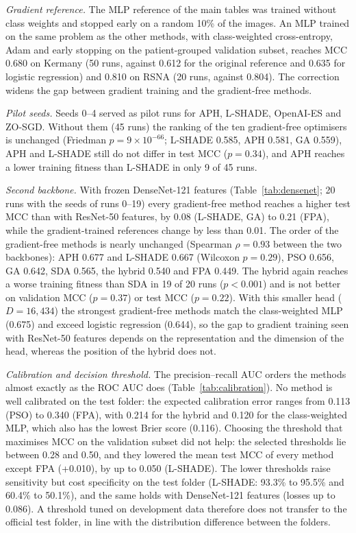 \documentclass[10pt,letterpaper]{article}
\begin{document}
\emph{Gradient reference.} The MLP reference of the main tables was trained without class weights and stopped early on a random 10\% of the images. An MLP trained on the same problem as the other methods, with class-weighted cross-entropy, Adam and early stopping on the patient-grouped validation subset, reaches MCC 0.680 on Kermany (50 runs, against 0.612 for the original reference and 0.635 for logistic regression) and 0.810 on RSNA (20 runs, against 0.804). The correction widens the gap between gradient training and the gradient-free methods.

\emph{Pilot seeds.} Seeds 0--4 served as pilot runs for APH, L-SHADE, OpenAI-ES and ZO-SGD. Without them (45 runs) the ranking of the ten gradient-free optimisers is unchanged (Friedman $p=9\times10^{-66}$; L-SHADE 0.585, APH 0.581, GA 0.559), APH and L-SHADE still do not differ in test MCC ($p=0.34$), and APH reaches a lower training fitness than L-SHADE in only 9 of 45 runs.

\emph{Second backbone.} With frozen DenseNet-121 features (Table~\ref{tab:densenet}; 20 runs with the seeds of runs 0--19) every gradient-free method reaches a higher test MCC than with ResNet-50 features, by 0.08 (L-SHADE, GA) to 0.21 (FPA), while the gradient-trained references change by less than 0.01. The order of the gradient-free methods is nearly unchanged (Spearman $\rho=0.93$ between the two backbones): APH 0.677 and L-SHADE 0.667 (Wilcoxon $p=0.29$), PSO 0.656, GA 0.642, SDA 0.565, the hybrid 0.540 and FPA 0.449. The hybrid again reaches a worse training fitness than SDA in 19 of 20 runs ($p<0.001$) and is not better on validation MCC ($p=0.37$) or test MCC ($p=0.22$). With this smaller head ($D=16{,}434$) the strongest gradient-free methods match the class-weighted MLP (0.675) and exceed logistic regression (0.644), so the gap to gradient training seen with ResNet-50 features depends on the representation and the dimension of the head, whereas the position of the hybrid does not.



\emph{Calibration and decision threshold.} The precision--recall AUC orders the methods almost exactly as the ROC AUC does (Table~\ref{tab:calibration}). No method is well calibrated on the test folder: the expected calibration error ranges from 0.113 (PSO) to 0.340 (FPA), with 0.214 for the hybrid and 0.120 for the class-weighted MLP, which also has the lowest Brier score (0.116). Choosing the threshold that maximises MCC on the validation subset did not help: the selected thresholds lie between 0.28 and 0.50, and they lowered the mean test MCC of every method except FPA (+0.010), by up to 0.050 (L-SHADE). The lower thresholds raise sensitivity but cost specificity on the test folder (L-SHADE: 93.3\% to 95.5\% and 60.4\% to 50.1\%), and the same holds with DenseNet-121 features (losses up to 0.086). A threshold tuned on development data therefore does not transfer to the official test folder, in line with the distribution difference between the folders.
\end{document}
